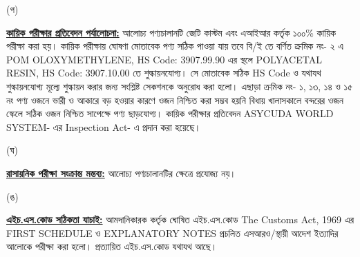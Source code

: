 \documentclass[12pt]{article}
\begin{document}
\begin{minipage}[t]{0.05\linewidth}
\hspace{1em}
\end{minipage}
\begin{minipage}[t]{0.05\linewidth}
(গ)
\end{minipage}
\begin{minipage}[t]{0.90\linewidth}
\underline{\textbf{কায়িক পরীক্ষার প্রতিবেদন পর্যালোচনা:}}
আলোচ্য পণ্যচালানটি জেটি কাস্টম এবং এআইআর কর্তৃক ১০০\% কায়িক পরীক্ষা করা হয়।
কায়িক পরীক্ষায় ঘোষণা মোতাবেক পণ্য সঠিক পাওয়া যায় তবে বি/ই তে বর্ণিত ক্রমিক নং- ২ এ POM OLOXYMETHYLENE, HS Code: 3907.99.90 এর স্থলে POLYACETAL RESIN, HS Code: 3907.10.00 তে শুল্কায়নযোগ্য। সে মোতাবেক সঠিক HS Code ও যথাযথ শুল্কায়নযোগ্য মূল্যে শুল্কায়ন করার জন্য সংশ্লিষ্ট সেকশনকে অনুরোধ করা হলো। এছাড়া ক্রমিক নং- ১, ১৩, ১৪ ও ১৫ নং পণ্য ওজনে ভারী ও আকারে বড় হওয়ার কারণে ওজন নিশ্চিত করা সম্ভব হয়নি বিধায় খালাসকালে বন্দরের ওজন স্কেলে সঠিক ওজন নিশ্চিত সাপেক্ষে পণ্য ছাড়যোগ্য।
কায়িক পরীক্ষার প্রতিবেদন ASYCUDA WORLD SYSTEM- এর Inspection Act- এ প্রদান করা হয়েছে।
\\
\end{minipage}
\begin{minipage}[t]{0.05\linewidth}
\hspace{1em}
\end{minipage}
\begin{minipage}[t]{0.05\linewidth}
(ঘ)
\end{minipage}
\begin{minipage}[t]{0.90\linewidth}
\underline{\textbf{রাসায়নিক পরীক্ষা সংক্রান্ত মন্তব্য:}}
আলোচ্য পণ্যচালানটির ক্ষেত্রে প্রযোজ্য নয়।
\\
\end{minipage}
\begin{minipage}[t]{0.05\linewidth}
\hspace{1em}
\end{minipage}
\begin{minipage}[t]{0.05\linewidth}
(ঙ)
\end{minipage}
\begin{minipage}[t]{0.90\linewidth}
\underline{\textbf{এইচ.এস.কোড সঠিকতা যাচাই:}}
আমদানিকারক কর্তৃক ঘোষিত এইচ.এস.কোড The Customs Act, 1969 এর FIRST SCHEDULE ও
EXPLANATORY NOTES প্রচলিত এসআরও/স্থায়ী আদেশ ইত্যাদির আলোকে পরীক্ষা করা হলো।
প্রত্যায়িত এইচ.এস.কোড যথাযথ আছে।
\\
\end{minipage}
\begin{minipage}[t]{0.05\linewidth}
\hspace{1em}
\end{minipage}
\end{document}
